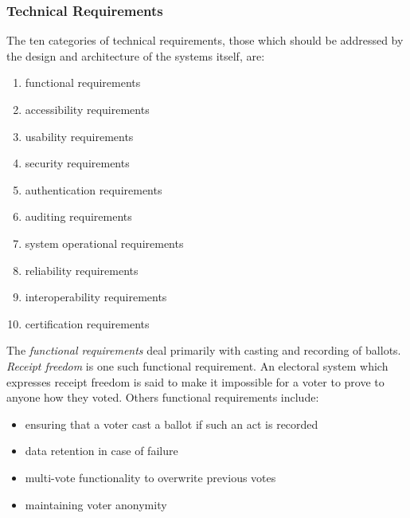 
\subsubsection{Technical Requirements}
The ten categories of technical requirements, those which should be addressed
by the design and architecture of the systems itself, are:\cite{e2e-viv}

\begin{enumerate}
    \item functional requirements
    \item accessibility requirements
    \item usability requirements
    \item security requirements
    \item authentication requirements
    \item auditing requirements
    \item system operational requirements
    \item reliability requirements
    \item interoperability requirements
    \item certification requirements
\end{enumerate}


The \emph{functional requirements} deal primarily with casting and recording of
ballots. \emph{Receipt freedom} is one such functional requirement. An
electoral system which expresses receipt freedom is said to make it impossible
for a voter to prove to anyone how they voted.
%
%
Others functional requirements include:
\begin{itemize}
    \item ensuring that a voter cast a ballot if such an act is recorded
    \item data retention in case of failure
    \item multi-vote functionality to overwrite previous votes
    \item maintaining voter anonymity
\end{itemize}

